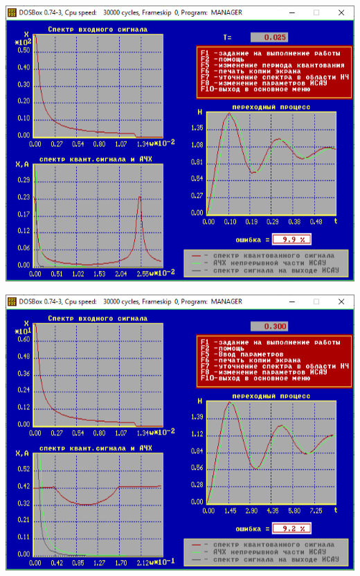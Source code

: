 	\begin{center}
		\noindent \begin{minipage}{.45\textwidth}
			\includegraphics[width=\textwidth]{png/graph2.png}
		\end{minipage} \begin{minipage}{.45\textwidth}
			\includegraphics[width=\textwidth]{png/graph3.png}
		\end{minipage}
		\label{tipoSauFig}
	\end{center}

